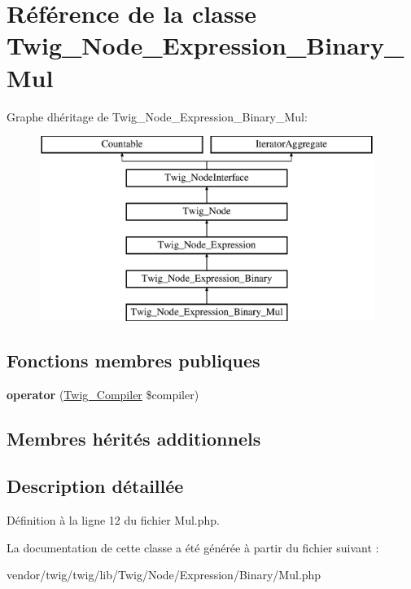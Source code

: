 \hypertarget{class_twig___node___expression___binary___mul}{}\section{Référence de la classe Twig\+\_\+\+Node\+\_\+\+Expression\+\_\+\+Binary\+\_\+\+Mul}
\label{class_twig___node___expression___binary___mul}
Graphe d\textquotesingle{}héritage de Twig\+\_\+\+Node\+\_\+\+Expression\+\_\+\+Binary\+\_\+\+Mul\+:\begin{figure}[H]
\begin{center}
\leavevmode
\includegraphics[height=6.000000cm]{class_twig___node___expression___binary___mul}
\end{center}
\end{figure}
\subsection*{Fonctions membres publiques}
\begin{DoxyCompactItemize}
\item 
{\bfseries operator} (\hyperlink{class_twig___compiler}{Twig\+\_\+\+Compiler} \$compiler)\hypertarget{class_twig___node___expression___binary___mul_af77318ec88d5f8a508684970a150b670}{}\label{class_twig___node___expression___binary___mul_af77318ec88d5f8a508684970a150b670}

\end{DoxyCompactItemize}
\subsection*{Membres hérités additionnels}


\subsection{Description détaillée}


Définition à la ligne 12 du fichier Mul.\+php.



La documentation de cette classe a été générée à partir du fichier suivant \+:\begin{DoxyCompactItemize}
\item 
vendor/twig/twig/lib/\+Twig/\+Node/\+Expression/\+Binary/Mul.\+php\end{DoxyCompactItemize}
